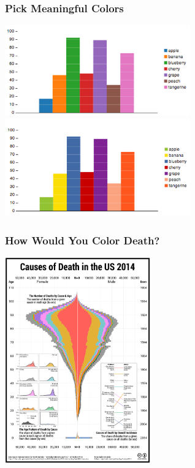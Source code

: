 \documentclass[hyperref={bookmarks=false}]{beamer}
\begin{document}

\begin{frame}
\frametitle{Pick Meaningful Colors}

\center\includegraphics[width = 0.6\textwidth]{./fig/lin_etal-2013-figure1c.png}\\
\center\includegraphics[width = 0.6\textwidth]{./fig/lin_etal-2013-figure1a.png}


\end{frame}


\begin{frame}
\frametitle{How Would You Color Death?}

\center\includegraphics[width = 0.47\textwidth]{./fig/codus2014_150dpi.png}


\end{frame}
\end{document}
